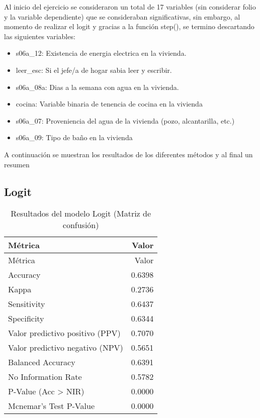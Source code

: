 \documentclass[Royal,times,sageh]{sagej}
\providecommand{\tightlist}{%
  \setlength{\itemsep}{0pt}\setlength{\parskip}{0pt}}
\begin{document}
Al inicio del ejercicio se consideraron un total de 17 variables (sin
considerar folio y la variable dependiente) que se consideraban
significativas, sin embargo, al momento de realizar el logit y gracias a
la función step(), se termino descartando las siguientes variables:

\begin{itemize}
\tightlist
\item
  s06a\_12: Existencia de energia electrica en la vivienda.
\item
  leer\_esc: Si el jefe/a de hogar sabia leer y escribir.\\
\item
  s06a\_08a: Dias a la semana con agua en la vivienda.
\item
  cocina: Variable binaria de tenencia de cocina en la vivienda
\item
  s06a\_07: Proveniencia del agua de la vivienda (pozo, alcantarilla,
  etc.)
\item
  s06a\_09: Tipo de baño en la vivienda
\end{itemize}

A continuación se muestran los resultados de los diferentes métodos y al
final un resumen

\subsection{Logit}\label{logit}

\begin{longtable}[]{@{}lr@{}}
\caption{Resultados del modelo Logit (Matriz de
confusión)}\tabularnewline
\toprule\noalign{}
Métrica & Valor \\
\midrule\noalign{}
\endfirsthead
\toprule\noalign{}
Métrica & Valor \\
\midrule\noalign{}
\endhead
\bottomrule\noalign{}
\endlastfoot
Accuracy & 0.6398 \\
Kappa & 0.2736 \\
Sensitivity & 0.6437 \\
Specificity & 0.6344 \\
Valor predictivo positivo (PPV) & 0.7070 \\
Valor predictivo negativo (NPV) & 0.5651 \\
Balanced Accuracy & 0.6391 \\
No Information Rate & 0.5782 \\
P-Value (Acc \textgreater{} NIR) & 0.0000 \\
Mcnemar's Test P-Value & 0.0000 \\
\end{longtable}
\end{document}
